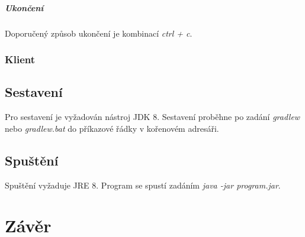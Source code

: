 \documentclass[12pt, a4paper]{report}
\begin{document}
\paragraph{Ukončení} Doporučený způsob ukončení je kombinací \emph{ctrl + c}.

\subsection{Klient}

\section{Sestavení}
Pro sestavení je vyžadován nástroj JDK 8.
Sestavení proběhne po zadání \emph{gradlew} nebo \emph{gradlew.bat} do příkazové řádky v kořenovém adresáři.

\section{Spuštění}
Spuštění vyžaduje JRE 8. Program se spustí zadáním \emph{java -jar program.jar}.


\chapter{Závěr}





\end{document}
